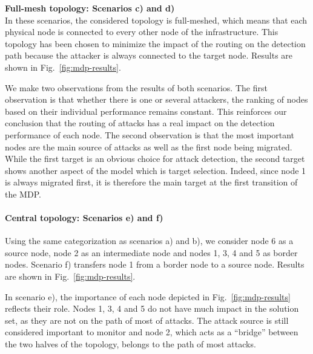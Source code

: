 \textbf{Full-mesh topology: Scenarios c) and d) \\}
In these scenarios, the considered topology is full-meshed, which means that each physical node is connected to every other node of the infrastructure. This topology has been chosen to minimize the impact of the routing on the detection path because the attacker is always connected to the target node.
Results are shown in Fig.~\ref{fig:mdp-results}.

We make two observations from the results of both scenarios.
The first observation is that whether there is one or several attackers, the ranking of nodes based on their individual performance remains constant. This reinforces our conclusion that the routing of attacks has a real impact on the detection performance of each node.
The second observation is that the most important nodes are the main source of attacks as well as the first node being migrated. While the first target is an obvious choice for attack detection, the second target shows another aspect of the model which is target selection. Indeed, since node 1 is always migrated first, it is therefore the main target at the first transition of the MDP.



\paragraph{Central topology: Scenarios e) and f)}
Using the same categorization as scenarios a) and b), we consider node 6 as a source node, node 2 as an intermediate node and nodes 1, 3, 4 and 5 as border nodes. Scenario f) transfers node 1 from a border node to a source node. Results are shown in Fig.~\ref{fig:mdp-results}.

In scenario e), the importance of each node depicted in Fig.~\ref{fig:mdp-results} reflects their role. Nodes 1, 3, 4 and 5 do not have much impact in the solution set, as they are not on the path of most of attacks. The attack source is still considered important to monitor and node 2, which acts as a ``bridge'' between the two halves of the topology, belongs to the path of most attacks.

